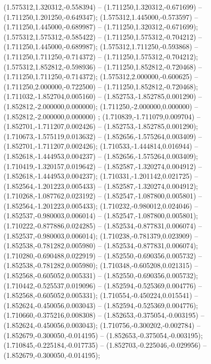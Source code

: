  (1.575312,1.320312,-0.558394) -- (1.711250,1.320312,-0.671699) -- (1.711250,1.201250,-0.649347);
 (1.575312,1.445000,-0.573597) -- (1.711250,1.445000,-0.689987) -- (1.711250,1.320312,-0.671699);
 (1.575312,1.575312,-0.585422) -- (1.711250,1.575312,-0.704212) -- (1.711250,1.445000,-0.689987);
 (1.575312,1.711250,-0.593868) -- (1.711250,1.711250,-0.714372) -- (1.711250,1.575312,-0.704212);
 (1.575312,1.852812,-0.598936) -- (1.711250,1.852812,-0.720468) -- (1.711250,1.711250,-0.714372);
 (1.575312,2.000000,-0.600625) -- (1.711250,2.000000,-0.722500) -- (1.711250,1.852812,-0.720468);
 (1.711032,-1.852704,0.005160) -- (1.852753,-1.852785,0.001290) -- (1.852812,-2.000000,0.000000);
 (1.711250,-2.000000,0.000000) -- (1.852812,-2.000000,0.000000) ;
 (1.710839,-1.711079,0.009704) -- (1.852701,-1.711207,0.002426) -- (1.852753,-1.852785,0.001290);
 (1.710673,-1.575119,0.013632) -- (1.852656,-1.575264,0.003409) -- (1.852701,-1.711207,0.002426);
 (1.710533,-1.444814,0.016944) -- (1.852618,-1.444953,0.004237) -- (1.852656,-1.575264,0.003409);
 (1.710419,-1.320157,0.019642) -- (1.852587,-1.320274,0.004912) -- (1.852618,-1.444953,0.004237);
 (1.710331,-1.201142,0.021725) -- (1.852564,-1.201223,0.005433) -- (1.852587,-1.320274,0.004912);
 (1.710268,-1.087762,0.023192) -- (1.852547,-1.087800,0.005801) -- (1.852564,-1.201223,0.005433);
 (1.710232,-0.980012,0.024046) -- (1.852537,-0.980003,0.006014) -- (1.852547,-1.087800,0.005801);
 (1.710222,-0.877886,0.024285) -- (1.852534,-0.877831,0.006074) -- (1.852537,-0.980003,0.006014);
 (1.710238,-0.781379,0.023909) -- (1.852538,-0.781282,0.005980) -- (1.852534,-0.877831,0.006074);
 (1.710280,-0.690488,0.022919) -- (1.852550,-0.690356,0.005732) -- (1.852538,-0.781282,0.005980);
 (1.710348,-0.605208,0.021315) -- (1.852568,-0.605052,0.005331) -- (1.852550,-0.690356,0.005732);
 (1.710442,-0.525537,0.019096) -- (1.852594,-0.525369,0.004776) -- (1.852568,-0.605052,0.005331);
 (1.710554,-0.450224,0.015541) -- (1.852624,-0.450056,0.003043) -- (1.852594,-0.525369,0.004776);
 (1.710660,-0.375216,0.008308) -- (1.852653,-0.375054,-0.003195) -- (1.852624,-0.450056,0.003043);
 (1.710756,-0.300202,-0.002784) -- (1.852679,-0.300050,-0.014195) -- (1.852653,-0.375054,-0.003195);
 (1.710845,-0.225184,-0.017735) -- (1.852703,-0.225046,-0.029956) -- (1.852679,-0.300050,-0.014195);
